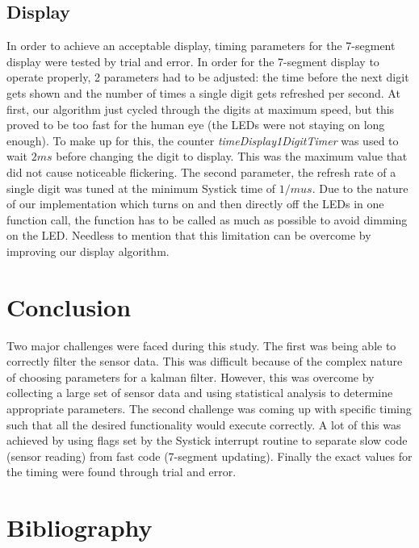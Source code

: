 \documentclass[12pt]{article}
\begin{document}
\subsection{Display}
In order to achieve an acceptable display, timing parameters for the 7-segment display were tested by trial and error. In order for the 7-segment display to operate properly, 2 parameters had to be adjusted: the time before the next digit gets shown and the number of times a single digit gets refreshed per second. At first, our algorithm just cycled through the digits at maximum speed, but this proved to be too fast for the human eye (the LEDs were not staying on long enough). To make up for this, the counter \textit{timeDisplay1DigitTimer} was used to wait $2ms$ before changing the digit to display. This was the maximum value that did not cause noticeable flickering. The second parameter, the refresh rate of a single digit was tuned at the minimum Systick time of $1/mu s$. Due to the nature of our implementation which turns on and then directly off the LEDs in one function call, the function has to be called as much as possible to avoid dimming on the LED. Needless to mention that this limitation can be overcome by improving our display algorithm.

\section{Conclusion}
Two major challenges were faced during this study. The first was being able to correctly filter the sensor data. This was difficult because of the complex nature of choosing parameters for a kalman filter. However, this was overcome by collecting a large set of sensor data and using statistical analysis to determine appropriate parameters.
The second challenge was coming up with specific timing such that all the desired functionality would execute correctly. A lot of this was achieved by using flags set by the Systick interrupt routine to separate slow code (sensor reading) from fast code (7-segment updating). Finally the exact values for the timing were found through trial and error.
\newpage
\section{Bibliography}

 
\end{document}
